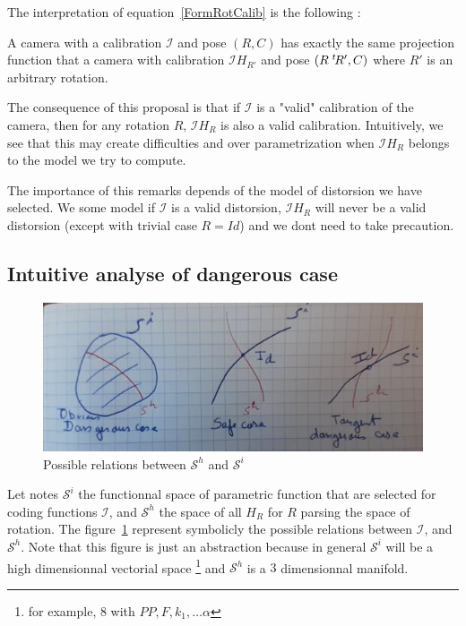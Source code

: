 The interpretation of equation~\ref{FormRotCalib} is the following : 

\begin{proposal}  \;
A camera with
a calibration $\mathcal{I}$ and pose $(R,C)$ has exactly the same projection
function that a camera with calibration $\mathcal{I} H_{R'}$ and pose $(R \; ^{t} \! R',C)$ where $R'$
is an arbitrary rotation.
\end{proposal}

The consequence of this proposal is that if $\mathcal{I}$ is a "valid" calibration of the
camera, then for any rotation $R$,  $\mathcal{I} H_{R}$ is also a valid calibration.
Intuitively, we see that this may create difficulties and over parametrization when
 $\mathcal{I} H_{R}$ belongs to the model we try to compute.

The importance of this remarks depends of the model of distorsion we have selected.
We some model if $\mathcal{I}$ is a valid distorsion,  $\mathcal{I} H_{R}$ will
never be a valid distorsion (except with trivial case $R=Id$) and we dont need
to take precaution.


\subsection{Intuitive analyse of dangerous case}

\begin{figure}
\centering
\includegraphics[width=12cm]{Methods/Images/TangentSpace.jpg}\caption{Possible relations between $\mathcal{S}^h$ and $\mathcal{S}^i$}
	\label{fig:TanSpace}
\end{figure}


Let notes  $\mathcal{S}^i$ the functionnal space of parametric function  that are selected
for coding functions $\mathcal{I}$, and $\mathcal{S}^h$ the space of all $H_R$ for
$R$ parsing the space of rotation.
The figure~\ref{fig:TanSpace} represent symbolicly the possible relations between
$\mathcal{I}$, and $\mathcal{S}^h$.  Note that this figure is just an
abstraction because in general $\mathcal{S}^i$ will be a high dimensionnal
vectorial space \footnote{for example, $8$ with $PP,F,k_1,\dots\alpha$} 
and  $\mathcal{S}^h$  is a $3$ dimensionnal manifold.

